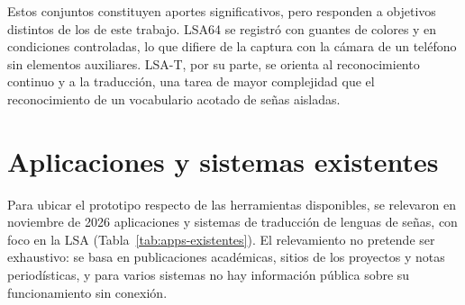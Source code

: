 Estos conjuntos constituyen aportes significativos, pero responden a objetivos distintos de los de este trabajo. LSA64 se registró con guantes de colores y en condiciones controladas, lo que difiere de la captura con la cámara de un teléfono sin elementos auxiliares. LSA-T, por su parte, se orienta al reconocimiento continuo y a la traducción, una tarea de mayor complejidad que el reconocimiento de un vocabulario acotado de señas aisladas.

\section{Aplicaciones y sistemas existentes}
\label{sec:apps-existentes}

Para ubicar el prototipo respecto de las herramientas disponibles, se relevaron en noviembre de 2026 aplicaciones y sistemas de traducción de lenguas de señas, con foco en la LSA (Tabla~\ref{tab:apps-existentes}). El relevamiento no pretende ser exhaustivo: se basa en publicaciones académicas, sitios de los proyectos y notas periodísticas, y para varios sistemas no hay información pública sobre su funcionamiento sin conexión.

